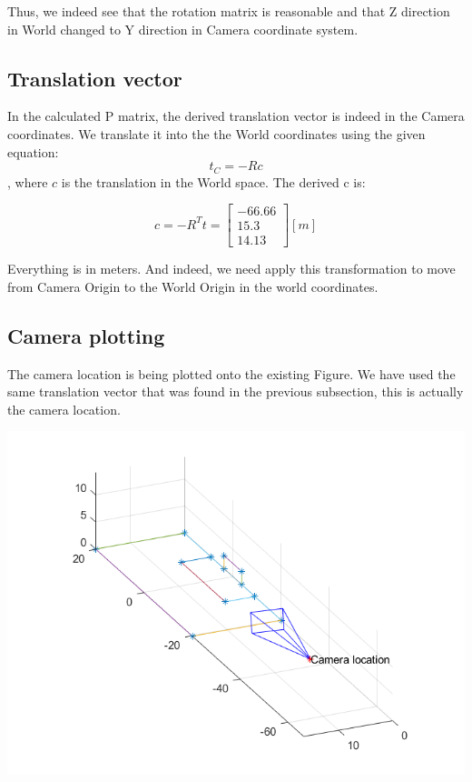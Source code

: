 \documentclass[a4paper]{iacas}
\begin{document}
Thus, we indeed see that the rotation matrix is reasonable and that Z direction in World changed to Y direction in Camera coordinate system.


\subsection{Translation vector}
In the calculated P matrix, the derived translation vector is indeed in the Camera coordinates. We translate it into the the World coordinates using the given equation: $$t_{C} = -Rc$$, where $c$ is the translation in the World space. The derived c is:

\begin{equation*}
c = -R^{T}t = 
\left[
\begin{matrix}
-66.66\\
15.3\\
14.13
\end{matrix}
\right] [m]
\end{equation*}

Everything is in meters. And indeed, we need apply this transformation to move from Camera Origin to the World Origin in the world coordinates.

\subsection{Camera plotting}
The camera location is being plotted onto the existing Figure. We have used the same translation vector that was found in the previous subsection, this is actually the camera location.


\vskip 0.1in
\begin{minipage}{\linewidth}
	\includegraphics[scale=0.8]{goal_res/camera_loc.png}
	\label{fig_2}
\end{minipage}
\vskip 0.1in
\end{document}
